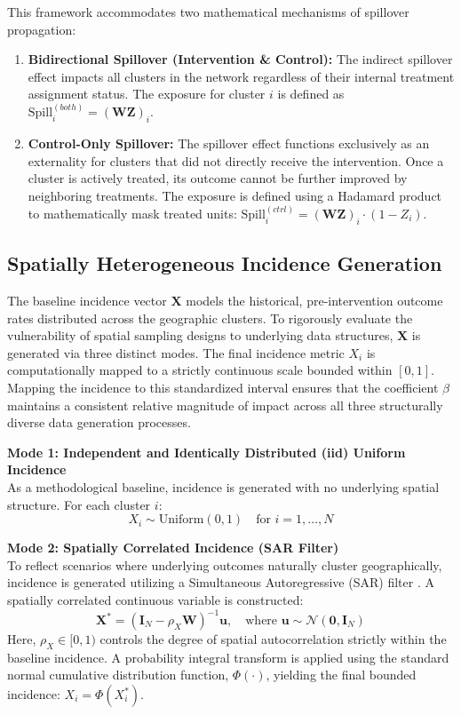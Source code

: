 \documentclass[11pt]{article}
\begin{document}
This framework accommodates two mathematical mechanisms of spillover propagation:
\begin{enumerate}
    \item \textbf{Bidirectional Spillover (Intervention \& Control):} The indirect spillover effect impacts all clusters in the network regardless of their internal treatment assignment status. The exposure for cluster $i$ is defined as $\text{Spill}_i^{(both)} = (\bm{W}\bm{Z})_i$.
    \item \textbf{Control-Only Spillover:} The spillover effect functions exclusively as an externality for clusters that did not directly receive the intervention. Once a cluster is actively treated, its outcome cannot be further improved by neighboring treatments. The exposure is defined using a Hadamard product to mathematically mask treated units: $\text{Spill}_i^{(ctrl)} = (\bm{W}\bm{Z})_i \cdot (1 - Z_i)$.
\end{enumerate}

\subsection{Spatially Heterogeneous Incidence Generation}

The baseline incidence vector $\bm{X}$ models the historical, pre-intervention outcome rates distributed across the geographic clusters. To rigorously evaluate the vulnerability of spatial sampling designs to underlying data structures, $\bm{X}$ is generated via three distinct modes. The final incidence metric $X_i$ is computationally mapped to a strictly continuous scale bounded within $[0, 1]$. Mapping the incidence to this standardized interval ensures that the coefficient $\beta$ maintains a consistent relative magnitude of impact across all three structurally diverse data generation processes.

\textbf{Mode 1: Independent and Identically Distributed (iid) Uniform Incidence}\\
As a methodological baseline, incidence is generated with no underlying spatial structure. For each cluster $i$:
\begin{equation}
    X_i \sim \text{Uniform}(0, 1) \quad \text{for } i = 1, \dots, N
\end{equation}

\textbf{Mode 2: Spatially Correlated Incidence (SAR Filter)}\\
To reflect scenarios where underlying outcomes naturally cluster geographically, incidence is generated utilizing a Simultaneous Autoregressive (SAR) filter \cite{lesage_introduction_2009}. A spatially correlated continuous variable is constructed:
\begin{equation}
    \bm{X}^* = (\bm{I}_N - \rho_X \bm{W})^{-1} \bm{u}, \quad \text{where } \bm{u} \sim \mathcal{N}(\bm{0}, \bm{I}_N)
\end{equation}
Here, $\rho_X \in [0, 1)$ controls the degree of spatial autocorrelation strictly within the baseline incidence. A probability integral transform is applied using the standard normal cumulative distribution function, $\Phi(\cdot)$, yielding the final bounded incidence: $X_i = \Phi(X_i^*)$.
\end{document}
